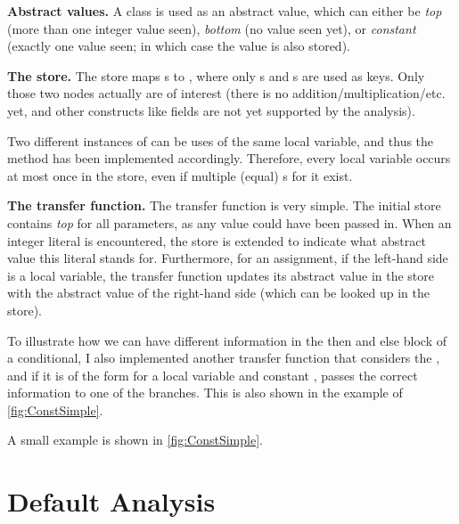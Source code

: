    \textbf{Abstract values.} A class  is used as an abstract value, which can
    either be \emph{top} (more than one integer value seen), \emph{bottom} (no value seen yet),
    or \emph{constant} (exactly one value seen; in which case the value is also stored).
    
    \textbf{The store.} The store maps s to ,
    where only s and s are
    used as keys.  Only those
    two nodes actually are of interest (there is no addition/multiplication/etc. yet, and other constructs like
    fields are not yet supported by the analysis).
    
    Two different instances of  can be uses of the same local variable, and thus
    the  method has been implemented accordingly. Therefore, every local variable occurs
    at most once in the store, even if multiple (equal) s for it exist.
    
    \textbf{The transfer function.} The transfer function is very simple. The initial store contains
    \emph{top} for all parameters, as any value could have been passed in.  When 
    an integer literal is encountered, the store is extended to indicate what abstract value this literal
    stands for. Furthermore, for an assignment, if the left-hand side is
    a local variable, the transfer function updates its abstract value in the
    store with the abstract value of the right-hand side (which can be looked up in the store).
    
    To illustrate how we can have different information in the then and else block of a conditional,
    I also implemented another transfer function that considers the , and if
    it is of the form  for a local variable  and constant , passes
    the correct information to one of the branches. This is also shown in the example of \autoref{fig:ConstSimple}.
    
     A small example is shown in \autoref{fig:ConstSimple}.




\section{Default Analysis}

